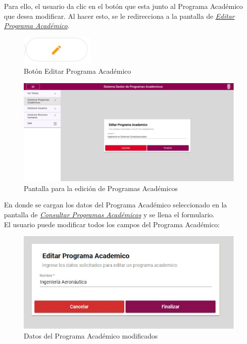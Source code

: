         	Para ello, el usuario da clic en el botón \BtnLapiz que esta junto al Programa Académico que desea modificar. Al hacer esto, se le redirecciona a la pantalla de \hyperlink{editarpa}{\textit{Editar Programa Académico}}.
        	\begin{figure}[H]
        		\centering
        		\hypertarget{editar}{\includegraphics[width=0.7\linewidth]{images/SP3/BtnEditar}}
        		\caption{Botón Editar Programa Académico}
        		\label{editar}
        	\end{figure}
        \begin{figure}[H]
        	\centering
        	\hypertarget{editarpa}{\includegraphics[width=0.7\linewidth]{images/SP3/EditarPA}}
        	\caption{Pantalla para la edición de Programas Académicos}
        	\label{editarpa}
        \end{figure}

        En donde se cargan los datos del Programa Académico seleccionado en la pantalla de \hyperlink{consultarpa}{\textit{Consultar Programas Académicos}} y se llena el formulario.\\

        El usuario puede modificar todos los campos del Programa Académico:
        \begin{figure}[H]
        	\centering
        	\hypertarget{modif}{\includegraphics[width=0.7\linewidth]{images/SP3/Editado}}
        	\caption{Datos del Programa Académico modificados}
        	\label{modif}
        \end{figure}

